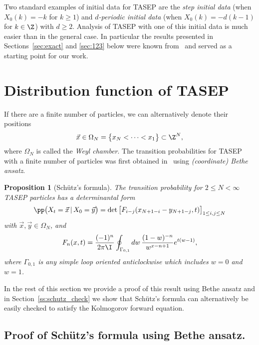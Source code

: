 \documentclass[]{pcmi}
\theoremstyle{plain}
\newtheorem{proposition}[equation]{Proposition}
\theoremstyle{definition}
\begin{document}
Two standard examples of initial data for TASEP are the \emph{step initial data} (when $X_0(k) = -k$ for $k \geq 1$) and \emph{$d$-periodic initial data} (when $X_0(k) = -d(k-1)$ for $k \in \Z$) with $d \geq 2$. Analysis of TASEP with one of this initial data is much easier than in the general case. In particular the results presented in Sections~\ref{sec:exact} and \ref{sec:123} below were known from~\cite{borFerPrahSasam,bfp,ferrariMatr} and served as a starting point for our work.

\section{Distribution function of TASEP}
\label{sec:distr}

If there are a finite number of particles, we can alternatively denote their positions 
\[
\vec x \in \Omega_N = \bigl\{x_N < \cdots < x_1 \bigr\} \subset \Z^N,
\] 
where $\Omega_N$ is called  the \emph{Weyl chamber}.
The transition probabilities for TASEP with a finite number of particles was first obtained in~\cite{MR1468391} using \emph{(coordinate) Bethe ansatz}. 

\begin{proposition}[Sch\"{u}tz's formula]\label{prop:Schuetz}
The transition probability for $2 \le N <\infty$ TASEP particles has a determinantal form
\begin{equation}\label{eq:Green}
	\pp \bigl(X_t = \vec x\, |\, X_0 = \vec y\bigr)=\det\big[F_{i - j}(x_{N+1 - i}-y_{N+1 - j},t)\big]_{1\leq i,j\leq N}
\end{equation}
with $\vec x, \vec y \in \Omega_N$,  and
\begin{equation}\label{eq:defF}
F_{n}(x, t)=\frac{(-1)^n}{2\pi \I} \oint_{\Gamma_{0,1}} dw\,\frac{(1-w)^{-n}}{w^{x-n+1}}e^{t(w-1)},
\end{equation}
where $\Gamma_{0,1}$ is any simple loop oriented anticlockwise which includes $w=0$ and $w=1$.
\end{proposition}

In the rest of this section we provide a proof of this result using Bethe ansatz and in Section~\ref{ss:schutz_check} we show that Sch\"{u}tz's formula can alternatively be easily checked to satisfy the Kolmogorov forward equation. 

\subsection{Proof of Sch\"{u}tz's formula using Bethe ansatz.}
\label{schutzba}
\end{document}
